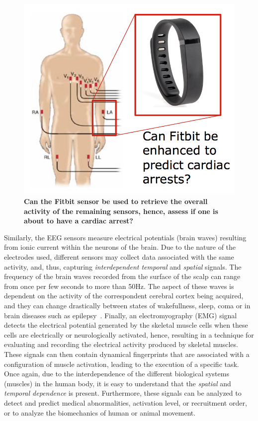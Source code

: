 \begin{figure}[htb]
\centering
\includegraphics[width=0.50\columnwidth]{fitbit.png}
\caption{\textbf{Can the Fitbit sensor be used to retrieve the overall activity of the remaining sensors, hence, assess if one is about to have a cardiac arrest?}}\label{fig:fitbit}
\vskip -2mm
\end{figure}  

Similarly, the EEG sensors measure electrical potentials (brain waves) resulting from ionic current within the neurons of the brain. Due to the nature of the electrodes used, different sensors may collect data associated with the same activity, and, thus, capturing \textit{interdependent temporal} and \textit{spatial} signals. The frequency of the brain waves recorded from the surface of the scalp can range from once per few seconds to more than 50Hz. The aspect of these waves is dependent on the activity of the correspondent cerebral cortex being acquired, and they can change drastically between states of wakefullness, sleep, coma or in brain diseases such as epilepsy~\cite{hall2015guyton}. Finally,  an electromyography (EMG) signal detects the electrical potential generated by the skeletal muscle cells when these cells are electrically or neurologically activated, hence, resulting in a technique for evaluating and recording the electrical activity produced by skeletal muscles. These signals can then contain dynamical fingerprints that are associated with a configuration of muscle activation, leading to the execution of a specific task. Once again, due to the interdependence of the different biological systems (muscles) in the human body, it is easy to understand that the \textit{spatial} and \textit{temporal dependence} is present. Furthermore, these signals can be analyzed to detect and predict medical abnormalities, activation level, or recruitment order, or to analyze the biomechanics of human or animal movement. 

